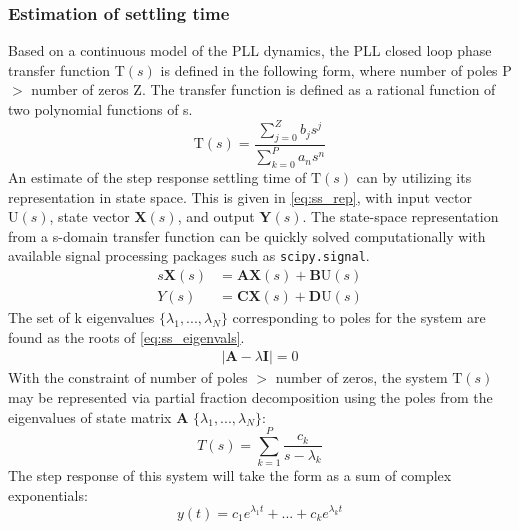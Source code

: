 \subsubsection{Estimation of settling time}

	Based on a continuous model of the PLL dynamics, the PLL closed loop phase transfer function $\mathrm{T}(s)$ is defined in the following form, where number of poles P $>$ number of zeros Z. The transfer function is defined as a rational function of two polynomial functions of s. 
	\begin{equation}\label{eq:pll_cl_tf}
	\mathrm{T}(s) = \frac{\sum_{j=0}^Z b_js^j}{\sum_{k=0}^P a_ns^n}
	\end{equation}
	An estimate of the step response settling time of $\mathrm{T}(s)$ can by utilizing its representation in state space. This is given in \ref{eq:ss_rep}, with input vector $\mathrm{U}(s)$, state vector $\mathbf{X}(s)$,  and output $\mathbf{Y}(s)$. The state-space representation from a s-domain transfer function can be quickly solved computationally with available signal processing packages such as \texttt{scipy.signal}.
	\begin{align} \label{eq:ss_rep}
		s\mathbf{X}(s) &= \mathbf{AX}(s) +\mathbf{B}\mathrm{U}(s)\\
		Y(s) &= \mathbf{CX}(s) +\mathbf{D}\mathrm{U}(s)
	\end{align}
	The set of k eigenvalues $\{\lambda_1, ... , \lambda_{N}\}$ corresponding to poles for the system are found as the roots of \ref{eq:ss_eigenvals}.%
	\begin{align}
		|\mathbf{A} - \lambda \mathbf{I}| = 0\label{eq:ss_eigenvals}%
	\end{align}
	With the constraint of number of poles $>$ number of zeros, the system $\mathrm{T}(s)$ may be represented via partial fraction decomposition using the poles from the eigenvalues of state matrix $\mathbf{A}$ $\{\lambda_1, ... , \lambda_{N}\}$:
	\begin{equation}
		T(s) = \sum_{k=1}^{P} \frac{c_k}{s-\lambda_k}
	\end{equation}
	The step response of this system will take the form as a sum of complex exponentials:
	\begin{equation}
		y(t) = c_1e^{\lambda_1t} + ... + c_ke^{\lambda_kt}%
	\end{equation}

